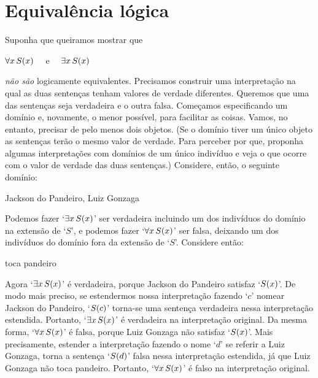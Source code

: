\section{Equivalência lógica}
Suponha que queiramos mostrar que
\begin{center}
	$\forall x\, \mathord{S}(x)$ \ \ e \ \ $\exists x\, \mathord{S}(x)$
\end{center}
\emph{não são} logicamente equivalentes.
Precisamos construir uma interpretação na qual as duas sentenças tenham valores de verdade diferentes.
Queremos que uma das sentenças seja verdadeira e o outra falsa.
Começamos especificando um domínio e, novamente, o menor possível, para facilitar as coisas.
Vamos, no entanto, precisar de pelo menos dois objetos.
(Se o domínio tiver um único objeto as sentenças terão o mesmo valor de verdade. 
Para perceber por que, proponha algumas interpretações com domínios de um único indivíduo e veja o que ocorre com o valor de verdade das duas sentenças.)
Considere, então, o seguinte domínio:
	\begin{center}
	\begin{ekey}
		\item[\text{domínio}] Jackson do Pandeiro, Luiz Gonzaga
	\end{ekey}
	\end{center}
Podemos fazer `$\exists x\, \mathord{S}(x)$' ser verdadeira incluindo um dos indivíduos do domínio na extensão de `$S$', e podemos fazer `$\forall x\, \mathord{S}(x)$' ser falsa, deixando um dos indivíduos do domínio fora da extensão de `$S$'.
Considere então:
	\begin{center}
	\begin{ekey}
		\item[\atom{S}{x}]  toca pandeiro
	\end{ekey}
	\end{center}
Agora `$\exists x\, \mathord{S}(x)$' é verdadeira, porque Jackson do Pandeiro satisfaz `$\mathord{S}(x)$'.
De modo mais preciso, se estendermos nossa interpretação fazendo `$c$' nomear Jackson do Pandeiro, `$\mathord{S}(c)$' torna-se uma sentença verdadeira nessa interpretação estendida.
Portanto, `$\exists x\, \mathord{S}(x)$' é verdadeira na interpretação original.
Da mesma forma, `$\forall x\, \mathord{S}(x)$' é falsa, porque Luiz Gonzaga não satisfaz `$\mathord{S}(x)$'.
Mais precisamente, estender a interpretação fazendo o nome `$d$' se referir a Luiz Gonzaga, torna a sentença `$\mathord{S}(d)$' falsa nessa interpretação estendida, já que Luiz Gonzaga não toca pandeiro.
Portanto, `$\forall x\, \mathord{S}(x)$' é falso na interpretação original.
